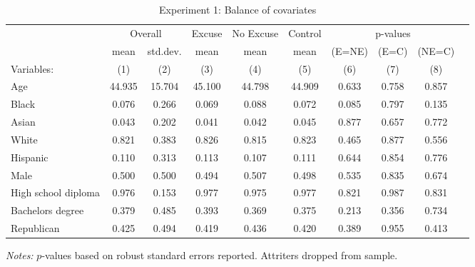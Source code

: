 \begin{table}[!ht]
\centering
\caption{Experiment 1: Balance of covariates}
\label{t:2-balance}
\vspace*{2mm}
\begin{threeparttable}
\begin{tabular}{lccccccccc}
\toprule
 & \multicolumn{2}{c}{Overall} & Excuse & No Excuse & Control & \multicolumn{3}{c}{p-values} \\
 \cmidrule(r){2-3} \cmidrule(lr){4-4} \cmidrule(lr){5-5} \cmidrule(lr){6-6} \cmidrule(lr){7-9} 
 & mean & std.dev. & mean & mean & mean & (E=NE) & (E=C) & (NE=C) \\
 \cmidrule(r){2-2} \cmidrule(lr){3-3} \cmidrule(lr){4-4} \cmidrule(lr){5-5} \cmidrule(l){6-6} \cmidrule(l){7-7} \cmidrule(l){8-8} \cmidrule(l){9-9}  
  Variables: & (1) & (2) & (3) & (4) & (5) & (6) & (7) & (8) \\ \midrule \midrule
Age & 44.935 & 15.704 & 45.100 & 44.798 & 44.909 & 0.633 & 0.758 & 0.857 \\
\addlinespace
Black & 0.076 & 0.266 & 0.069 & 0.088 & 0.072 & 0.085 & 0.797 & 0.135 \\
Asian & 0.043 & 0.202 & 0.041 & 0.042 & 0.045 & 0.877 & 0.657 & 0.772 \\
White & 0.821 & 0.383 & 0.826 & 0.815 & 0.823 & 0.465 & 0.877 & 0.556 \\
Hispanic & 0.110 & 0.313 & 0.113 & 0.107 & 0.111 & 0.644 & 0.854 & 0.776 \\
\addlinespace
Male & 0.500 & 0.500 & 0.494 & 0.507 & 0.498 & 0.535 & 0.835 & 0.674 \\
\addlinespace
High school diploma & 0.976 & 0.153 & 0.977 & 0.975 & 0.977 & 0.821 & 0.987 & 0.831 \\
Bachelors degree & 0.379 & 0.485 & 0.393 & 0.369 & 0.375 & 0.213 & 0.356 & 0.734 \\
\addlinespace
Republican & 0.425 & 0.494 & 0.419 & 0.436 & 0.420 & 0.389 & 0.955 & 0.413 \\
 \midrule
\bottomrule
\end{tabular}
\begin{tablenotes}[flushleft] \footnotesize
\item \textit{Notes: }$p$-values based on robust standard errors reported. Attriters dropped from sample.
\end{tablenotes} \end{threeparttable} \end{table}
